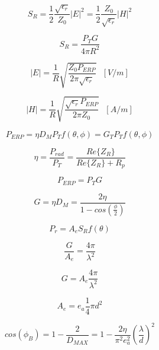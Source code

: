 \begin{equation}
	S_R=\frac{1}{2}\frac{\sqrt{\epsilon_r}}{Z_0}|E|^2= \frac{1}{2}\frac{Z_0}{\sqrt{\epsilon_r}}|H|^2
\end{equation}

\begin{equation}	
S_R= \frac{P_TG}{4 \pi R^2}
\end{equation}

\begin{equation}
	|E| = \frac{1}{R} \sqrt{\frac{Z_0 P_{ERP}}{2\pi \sqrt{\epsilon_r}}} \ \ \ [V/m]
\end{equation}

\begin{equation}
	|H| = \frac{1}{R} \sqrt{\frac{\sqrt{\epsilon_r} P_{ERP}}{2\pi Z_0}} \ \ \ [A/m]
\end{equation}

\begin{equation}
	P_{ERP}= \eta D_M P_T f(\theta , \phi) = G_T P_T f(\theta , \phi)
\end{equation}

\begin{equation}
  	\eta = \frac{P_{rad}}{P_T}= \frac{Re\{ Z_R \}}{Re\{ Z_R \}+R_p}
  \end{equation}  

\begin{equation}
	P_{ERP} = P_TG 
\end{equation}

\begin{equation}
	G = \eta D_M=\frac{2\eta}{1-cos(\frac{\phi}{2})}
\end{equation}

\begin{equation}
	P_r=A_{\textit{e}} S_R f(\theta)
\end{equation}

\begin{equation}
	\frac{G}{A_e}=\frac{4 \pi }{\lambda^2}
\end{equation}

\begin{equation}
	G=A_e\frac{4 \pi}{\lambda^2}
\end{equation}

\begin{equation}
	A_e = e_a \frac{1}{4} \pi d^2
\end{equation}

\begin{equation}
	cos(\phi_B)=  1- \frac{2}{D_{MAX}}=  1 - \frac {2\eta} {\pi^2 e_a^2} \left( \frac{\lambda}{d} \right)^2
\end{equation}

